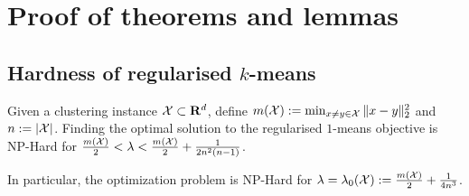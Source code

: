 \section{Proof of theorems and lemmas}
\subsection{Hardness of regularised $k$-means}
\label{a-section:hardness}
\begin{theorem}
\label{a-theorem:hardFork1Fixed}
Given a clustering instance $\mathcal X \subset \mathbf R^{d}$, define $m(\mathcal X) := \min_{x \neq y \in \mathcal X} \|x-y\|_{2}^2$ and $n := |\mathcal X|$. Finding the optimal solution to the regularised $1$-means objective is NP-Hard for $\frac{m(\mathcal X)}{2} < \lambda < \frac{m(\mathcal X)}{2} + \frac{1}{2n^2(n-1)}$. 

In particular, the optimization problem is NP-Hard for $\lambda = \lambda_0(\mathcal X) := \frac{m(\mathcal X)}{2} + \frac{1}{4n^3}$.
\end{theorem}

